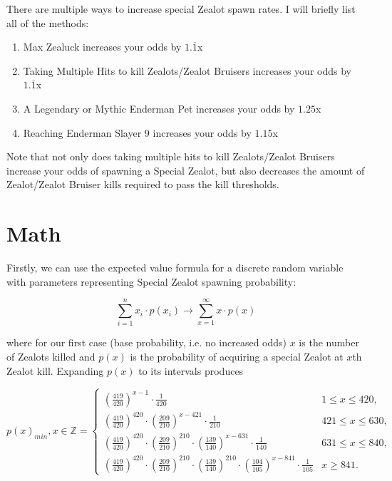\documentclass{article}
\begin{document}
\vspace{2mm}

There are multiple ways to increase special Zealot spawn rates. I will briefly list all of the methods:

\begin{enumerate}
    \item Max Zealuck increases your odds by \(1.\overline{1}\)x
    \item Taking Multiple Hits to kill Zealots/Zealot Bruisers increases your odds by \(1.\overline{1}\)x
    \item A Legendary or Mythic Enderman Pet increases your odds by \(1.25\)x
    \item Reaching Enderman Slayer 9 increases your odds by \(1.15\)x
\end{enumerate}

\vspace{2mm}

Note that not only does taking multiple hits to kill Zealots/Zealot Bruisers increase your odds of spawning a Special Zealot, but also decreases the amount of Zealot/Zealot Bruiser kills required to pass the kill thresholds.

\section{Math}

Firstly, we can use the expected value formula for a discrete random variable with parameters representing Special Zealot spawning probability:

\[
\sum_{i=1}^{n} x_i \cdot p(x_i) \rightarrow \sum_{x=1}^{\infty} x \cdot p(x)
\]

where for our first case (base probability, i.e. no increased odds) $x$ is the number of Zealots killed and $p(x)$ is the probability of acquiring a special Zealot at $x$th Zealot kill. Expanding $p(x)$ to its intervals produces

\[
p(x)_{min}, x \in \mathbb{Z} =
\begin{cases} 
\left(\frac{419}{420}\right)^{x-1} \cdot \frac{1}{420} & 1 \leq x \leq 420, \\
\left(\frac{419}{420}\right)^{420} \cdot \left(\frac{209}{210}\right)^{x-421} \cdot \frac{1}{210} & 421 \leq x \leq 630, \\
\left(\frac{419}{420}\right)^{420} \cdot \left(\frac{209}{210}\right)^{210} \cdot \left(\frac{139}{140}\right)^{x-631} \cdot \frac{1}{140} & 631 \leq x \leq 840, \\
\left(\frac{419}{420}\right)^{420} \cdot \left(\frac{209}{210}\right)^{210} \cdot \left(\frac{139}{140}\right)^{210} \cdot \left(\frac{104}{105}\right)^{x-841} \cdot \frac{1}{105} & x \geq 841.
\end{cases}
\]
\end{document}
